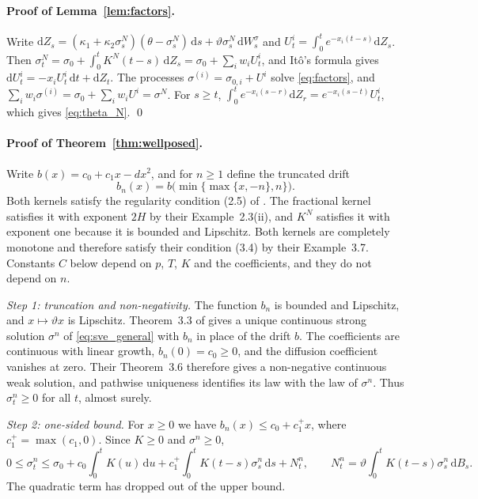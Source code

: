 \documentclass[11pt,a4paper]{article}
\theoremstyle{definition}
\newcommand{\D}{\mathrm{d}}
\begin{document}
\paragraph{Proof of Lemma~\ref{lem:factors}.} Write $\D Z_s=(\kappa_1+\kappa_2\sigma^N_s)(\theta-\sigma^N_s)\,\D s+\vartheta\sigma^N_s\,\D W^\sigma_s$ and $U^{i}_t=\int_0^te^{-x_i(t-s)}\D Z_s$. Then $\sigma^N_t=\sigma_0+\int_0^tK^N(t-s)\,\D Z_s=\sigma_0+\sum_iw_iU^i_t$, and It\^o's formula gives $\D U^i_t=-x_iU^i_t\,\D t+\D Z_t$. The processes $\sigma^{(i)}=\sigma_{0,i}+U^i$ solve \eqref{eq:factors}, and $\sum_iw_i\sigma^{(i)}=\sigma_0+\sum_iw_iU^i=\sigma^N$. For $s\ge t$, $\int_0^te^{-x_i(s-r)}\D Z_r=e^{-x_i(s-t)}U^i_t$, which gives \eqref{eq:theta_N}. \qed

\paragraph{Proof of Theorem~\ref{thm:wellposed}.} Write $b(x)=c_0+c_1x-dx^2$, and for $n\ge1$ define the truncated drift
\begin{equation*}
b_n(x)=b\big(\min\{\max\{x,-n\},n\}\big).
\end{equation*}
Both kernels satisfy the regularity condition (2.5) of \citet{AbiJaberLarssonPulido2019}. The fractional kernel satisfies it with exponent $2H$ by their Example~2.3(ii), and $K^N$ satisfies it with exponent one because it is bounded and Lipschitz. Both kernels are completely monotone and therefore satisfy their condition (3.4) by their Example~3.7. Constants $C$ below depend on $p$, $T$, $K$ and the coefficients, and they do not depend on $n$.

\emph{Step 1: truncation and non-negativity.} The function $b_n$ is bounded and Lipschitz, and $x\mapsto\vartheta x$ is Lipschitz. Theorem~3.3 of \citet{AbiJaberLarssonPulido2019} gives a unique continuous strong solution $\sigma^n$ of \eqref{eq:sve_general} with $b_n$ in place of the drift $b$. The coefficients are continuous with linear growth, $b_n(0)=c_0\ge0$, and the diffusion coefficient vanishes at zero. Their Theorem~3.6 therefore gives a non-negative continuous weak solution, and pathwise uniqueness identifies its law with the law of $\sigma^n$. Thus $\sigma^n_t\ge0$ for all $t$, almost surely.

\emph{Step 2: one-sided bound.} For $x\ge0$ we have $b_n(x)\le c_0+c_1^+x$, where $c_1^+=\max(c_1,0)$. Since $K\ge0$ and $\sigma^n\ge0$,
\begin{equation}\label{eq:one_sided}
0\le\sigma^n_t\le\sigma_0+c_0\int_0^tK(u)\,\D u+c_1^+\int_0^tK(t-s)\sigma^n_s\,\D s+N^n_t,\qquad N^n_t=\vartheta\int_0^tK(t-s)\sigma^n_s\,\D B_s .
\end{equation}
The quadratic term has dropped out of the upper bound.
\end{document}
